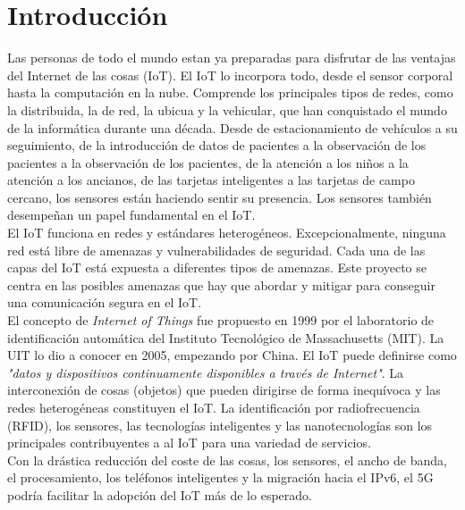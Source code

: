 \chapter{Introducción}

Las personas de todo el mundo estan ya preparadas para disfrutar de las ventajas del Internet de las cosas (IoT). El IoT lo incorpora todo, desde el sensor corporal hasta la computación en la nube. Comprende los principales tipos de redes, como la distribuida, la de red, la ubicua y la vehicular, que han conquistado el mundo de la informática durante una década. Desde de estacionamiento de vehículos a su seguimiento, de la introducción de datos de pacientes a la observación de los pacientes a la observación de los pacientes, de la atención a los niños a la atención a los ancianos, de las tarjetas inteligentes a las tarjetas de campo cercano, los sensores están haciendo sentir su presencia. Los sensores también desempeñan un papel fundamental en el IoT.\\

El IoT funciona en redes y estándares heterogéneos. Excepcionalmente, ninguna red está libre de amenazas y vulnerabilidades de seguridad. Cada una de las capas del IoT está expuesta a diferentes tipos de amenazas. Este proyecto se centra en las posibles amenazas que hay que abordar y mitigar para conseguir una comunicación segura en el IoT.\\


El concepto de \textit{Internet of Things} fue propuesto en 1999 por el laboratorio de identificación automática del Instituto Tecnológico de Massachusetts (MIT). La UIT lo dio a conocer en 2005, empezando por China. El IoT puede definirse como \textit{"datos y dispositivos continuamente disponibles a través de Internet"}. La interconexión de cosas (objetos) que pueden dirigirse de forma inequívoca y las redes heterogéneas constituyen el IoT. La identificación por radiofrecuencia (RFID), los sensores, las tecnologías inteligentes y las nanotecnologías son los principales contribuyentes a al IoT para una variedad de servicios.\\

Con la drástica reducción del coste de las cosas, los sensores, el ancho de banda, el procesamiento, los teléfonos inteligentes y la migración hacia el IPv6, el 5G podría facilitar la adopción del IoT más de lo esperado.\\

